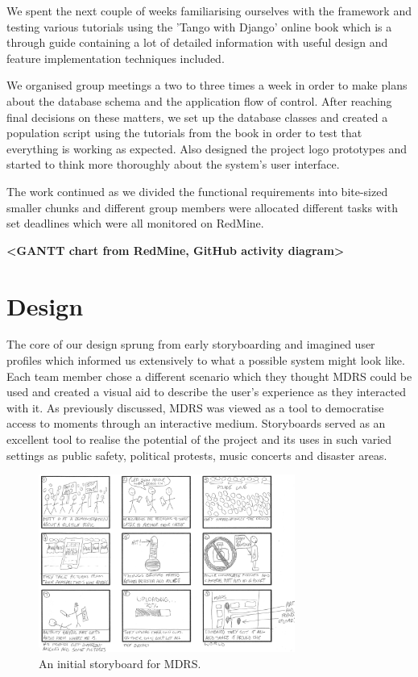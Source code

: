 \documentclass{l3proj}
\begin{document}
We spent the next couple of weeks familiarising ourselves with the framework and testing various tutorials using the 'Tango with Django' online book which is a through guide containing a lot of detailed information with useful design and feature implementation techniques included.

We organised group meetings a two to three times a week in order to make plans about the database schema and the application flow of control. After reaching final decisions on these matters, we set up the database classes and created a population script using the tutorials from the book in order to test that everything is working as expected. Also designed the project logo prototypes and started to think more thoroughly about the system's user interface.

The work continued as we divided the functional requirements into bite-sized smaller chunks and different group members were allocated different tasks with set deadlines which were all monitored on RedMine.

\textbf{<GANTT chart from RedMine, GitHub activity diagram>}




\chapter{Design}
\label{design}

The core of our design sprung from early storyboarding and imagined user
profiles which informed us extensively to what a possible system might look
like. Each team member chose a different scenario which they thought MDRS could be used and created a visual aid to describe the user's experience as they interacted with it. As previously discussed, MDRS was viewed as a tool to democratise access to moments through an interactive medium. Storyboards served as an excellent tool to realise the potential of the project and its uses in such varied settings as public safety, political protests, music concerts and disaster areas.

\begin{figure}[ht!]
\centering
\includegraphics[width=0.75\textwidth]{images/ally-storyboard.jpg}
\caption{An initial storyboard for MDRS.}
\end{figure}
\end{document}
